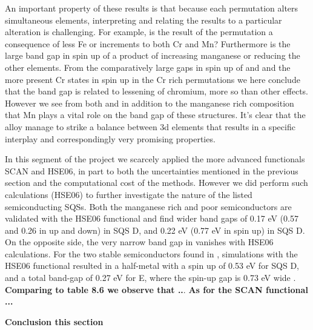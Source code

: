 An important property of these results is that because each permutation alters simultaneous elements, interpreting and relating the results to a particular alteration is challenging. For example, is the result of the  permutation a consequence of less Fe or increments to both Cr and Mn? Furthermore is the large band gap in spin up of  a product of increasing manganese or reducing the other elements. From the comparatively large gaps in spin up of  and  and the more present Cr states in spin up in the Cr rich permutations we here conclude that the band gap is related to lessening of chromium, more so than other effects. However we see from both  and  in addition to the manganese rich composition that Mn plays a vital role on the band gap of these structures. It's clear that the  alloy manage to strike a balance between 3d elements that results in a specific interplay and correspondingly very promising properties.


In this segment of the project we scarcely applied the more advanced functionals SCAN and HSE06, in part to both the uncertainties mentioned in the previous section and the computational cost of the methods. However we did perform such calculations (HSE06) to further investigate the nature of the listed semiconducting SQSs. Both the manganese rich and poor semiconductors are validated with the HSE06 functional and find wider band gaps of 0.17 eV (0.57 and 0.26 in up and down) in  SQS D, and 0.22 eV (0.77 eV in spin up) in  SQS D. On the opposite side, the very narrow band gap in  vanishes with HSE06 calculations. For the two stable semiconductors found in , simulations with the HSE06 functional resulted in a half-metal with a spin up of 0.53 eV for SQS D, and a total band-gap of 0.27 eV for E, where the spin-up gap is 0.73 eV wide
. \textbf{Comparing to table 8.6 we observe that ..}. \textbf{As for the SCAN functional ...} 

\textbf{Conclusion this section \\}
